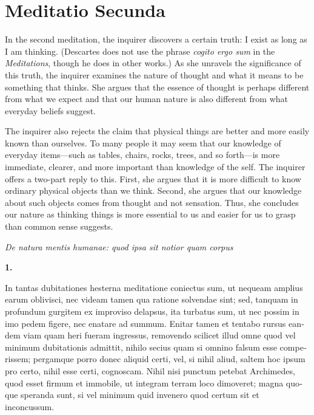 \chapter{Meditatio Secunda}


In the second meditation, the inquirer discovers a certain truth: I exist as long as I am thinking. (Descartes does not use the phrase \textit{cogito ergo sum} in the \textit{Meditations}, though he does in other works.) As she unravels the significance of this truth, the inquirer examines the nature of thought and what it means to be something that thinks. She argues that the essence of thought is perhaps different from what we expect and that our human nature is also different from what everyday beliefs suggest.

The inquirer also rejects the claim that physical things are better and more easily known than ourselves. To many people it may seem that our knowledge of everyday items---such as tables, chairs, rocks, trees, and so forth---is more immediate, clearer, and more important than knowledge of the self. The inquirer offers a two-part reply to this. First, she argues that it is more difficult to know ordinary physical objects than we think. Second, she argues that our knowledge about such objects comes from thought and not sensation. Thus, she concludes our nature as thinking things is more essential to us and easier for us to grasp than common sense suggests.

\clearpage

\clearpage
\begin{center}
    \beginnumbering
    \numberlinefalse
    \pstart
    \textit{De natura mentis humanae: quod ipsa sit notior quam corpus}
    \pend
    \endnumbering
\end{center}

\beginnumbering
\pstart
    \textbf{1.} \begin{latin}In tantas dubitationes hesterna meditatione coniectus sum, ut nequeam amplius earum oblivisci, nec videam tamen qua ratione solvendae sint; sed, tanquam in profundum gurgitem ex improviso delapsus, ita turbatus sum, ut nec possim in imo pedem figere, nec enatare ad summum. Enitar tamen et tentabo rursus eandem viam quam heri fueram ingressus, removendo scilicet illud omne quod vel minimum dubitationis admittit, nihilo secius quam si omnino falsum esse comperissem; pergamque porro donec aliquid certi, vel, si nihil aliud, saltem hoc ipsum pro certo, nihil esse certi, cognoscam. Nihil nisi punctum petebat Archimedes, quod esset firmum et immobile, ut integram terram loco dimoveret; magna quoque speranda sunt, si vel minimum quid invenero quod certum sit et inconcussum.\end{latin}
\pend
\endnumbering
\beginnumbering
\pstart

